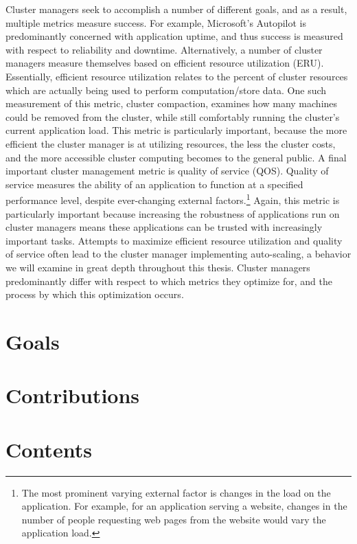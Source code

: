 Cluster managers seek to accomplish a number of different goals, and as a
result, multiple metrics measure success. For example, Microsoft's Autopilot is
predominantly concerned with application uptime, and thus success is measured
with respect to reliability and downtime.\cite[pg. 1]{autopilot}
Alternatively, a number of cluster managers measure themselves based on
efficient resource utilization (ERU).\cite[pg. 7]{borg} Essentially, efficient
resource utilization relates to the percent of cluster resources which are
actually being used to perform computation/store data.
One such measurement of this metric, cluster
compaction, examines how many machines could be removed from the cluster, while
still comfortably running the cluster's current application load.\cite[pg.
5]{evaluating-job-packing-in-warehouse-scale-computing} This metric is
particularly important, because the more efficient the cluster manager is at
utilizing resources, the less the cluster costs, and the more accessible cluster
computing becomes to the general public. A final important
cluster management metric is quality of service (QOS). Quality of service measures the
ability of an application to function at a specified
performance level, despite ever-changing
external factors.\footnote{The most prominent varying external factor is changes
in the load on the application. For example, for an application serving a
website, changes in the number of people requesting web pages from the website
would vary the application load.} Again, this metric is particularly important because
increasing the robustness of applications run on cluster managers means
these applications can be trusted with increasingly important tasks. Attempts to
maximize efficient resource utilization and quality of service
often lead to the cluster manager implementing
auto-scaling, a behavior we will examine in great depth throughout this thesis. Cluster
managers predominantly differ with respect to which metrics they optimize
for, and the process by which this optimization occurs.

\section{Goals}



\section{Contributions}



\section{Contents}



